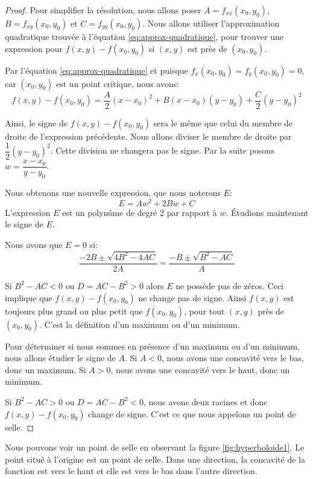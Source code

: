 \documentclass[]{book}
\theoremstyle{definition}
\theoremstyle{definition}
\theoremstyle{definition}
\theoremstyle{remark}
\let\BeginKnitrBlock\begin \let\EndKnitrBlock\end
\begin{document}
\BeginKnitrBlock{proof}
{}Pour simplifier la résolution, nous allons
poser \(A=f_{xx}(x_0,y_0)\), \(B=f_{xy}(x_0,y_0)\) et
\(C=f_{yy}(x_0,y_0)\). Nous allons utiliser l'approximation quadratique
trouvée à l'équation \eqref{eq:approx-quadratique}, pour trouver une
expression pour \(f(x,y)-f(x_0,y_0)\) si \((x,y)\) est près de
\((x_0,y_0)\).

Par l'équation \eqref{eq:approx-quadratique} et puisque
\(f_x(x_0,y_0)=f_y(x_0,y_0)=0\), car \((x_0,y_0)\) est un point
critique, nous avons:
\[ f(x,y)-f(x_0,y_0)=\dfrac{A}{2}(x-x_0)^2+B(x-x_0)(y-y_0)+\dfrac{C}{2}(y-y_0)^2 \]

Ainsi, le signe de \(f(x,y)-f(x_0,y_0)\) sera le même que celui du
membre de droite de l'expression précédente. Nous allons diviser le
membre de droite par \(\dfrac{1}{2}(y-y_0)^2\). Cette division ne
changera pas le signe. Par la suite posons \(w=\dfrac{x-x_0}{y-y_0}\).

Nous obtenons une nouvelle expression, que nous noterons \(E\):
\[ E = Aw^2+2Bw+C \] L'expression \(E\) est un polynôme de degré 2 par
rapport à \(w\). Étudions maintenant le signe de \(E\).

Nous avons que \(E=0\) si:
\[ \dfrac{-2B\pm\sqrt{4B^2-4AC}}{2A}=\dfrac{-B\pm\sqrt{B^2-AC}}{A} \]

Si \(B^2-AC<0\) ou \(D=AC-B^2>0\) alors \(E\) ne possède pas de zéros.
Ceci implique que \(f(x,y)-f(x_0,y_0)\) ne change pas de signe. Ainsi
\(f(x,y)\) est toujours plus grand ou plus petit que \(f(x_0,y_0)\),
pour tout \((x,y)\) près de \((x_0,y_0)\). C'est la définition d'un
maximum ou d'un minimum.

Pour déterminer si nous sommes en présence d'un maximum ou d'un minimum,
nous allons étudier le signe de \(A\). Si \(A<0\), nous avons une
concavité vers le bas, donc un maximum. Si \(A>0\), nous avons une
concavité vers le haut, donc un minimum.

Si \(B^2-AC>0\) ou \(D=AC-B^2<0\), nous avons deux racines et donc
\(f(x,y)-f(x_0,y_0)\) change de signe. C'est ce que nous appelons un
point de selle.
\EndKnitrBlock{proof}

Nous pouvons voir un point de selle en observant la figure
\ref{fig:hyperboloide1}. Le point situé à l'origine est un point de
selle. Dans une direction, la concavité de la fonction est vers le haut
et elle est vers le bas dans l'autre direction.
\end{document}
